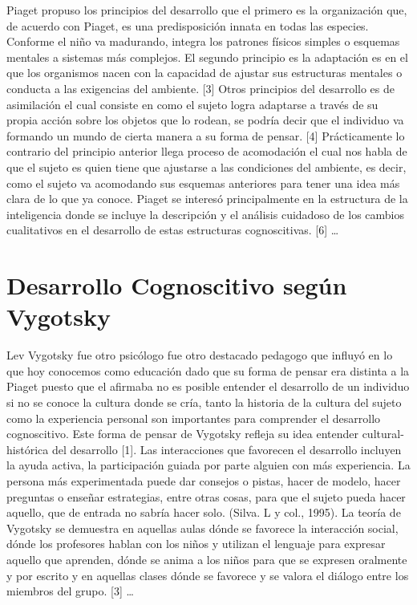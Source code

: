 \documentclass{bmcart}
\begin{document}
\newline
\newline
Piaget propuso los principios del desarrollo que el  primero  es  la  organización  que,  de  acuerdo  con Piaget,  es  una  predisposición  innata  en  todas  las  especies.  Conforme  el  niño  va madurando, integra los patrones físicos simples o esquemas mentales a sistemas más complejos.  El  segundo  principio  es  la  adaptación es en el que los  organismos nacen  con  la  capacidad  de  ajustar  sus  estructuras  mentales  o  conducta  a  las exigencias del ambiente. [3]
\newline
\newline
Otros principios del desarrollo es de asimilación el cual consiste en como el sujeto logra adaptarse a través de su propia acción sobre los objetos que lo rodean, se podría decir que el individuo va formando un mundo de cierta manera a su forma de pensar. [4] Prácticamente lo contrario del principio anterior llega proceso de acomodación el cual nos habla de que el sujeto es quien tiene que ajustarse a las condiciones del ambiente, es decir, como el sujeto va acomodando sus esquemas anteriores para tener una idea más clara de lo que ya conoce.
\newline
\newline
Piaget se interesó principalmente en la estructura de la inteligencia donde se incluye la descripción y el análisis cuidadoso de los cambios cualitativos en el desarrollo de estas estructuras cognoscitivas. [6]
 \ldots

\section*{Desarrollo Cognoscitivo según Vygotsky}
Lev Vygotsky fue otro psicólogo fue otro destacado pedagogo que influyó en lo que hoy conocemos como educación dado que su forma de pensar era distinta a la Piaget puesto que el afirmaba no es posible entender el desarrollo de un individuo si no se conoce la cultura donde se cría, tanto la historia de la cultura del sujeto como la experiencia personal son importantes para comprender el desarrollo cognoscitivo. Este forma de pensar de Vygotsky refleja su idea entender cultural-histórica del desarrollo [1].
\newline
\newline
Las interacciones que favorecen el desarrollo incluyen la ayuda activa, la participación guiada por parte alguien con más experiencia. La persona más experimentada puede dar consejos o pistas, hacer de modelo, hacer preguntas o enseñar estrategias, entre otras cosas, para que el sujeto pueda hacer aquello, que de entrada no sabría hacer solo. (Silva. L y col., 1995).
\newline
\newline
La teoría de Vygotsky se demuestra en aquellas aulas dónde se favorece la interacción social, dónde los profesores hablan con los niños y utilizan el lenguaje para expresar aquello que aprenden, dónde se anima a los niños para que se expresen oralmente y por escrito y en aquellas clases dónde se favorece y se valora el diálogo entre los miembros del grupo. [3]
\ldots
\end{document}
